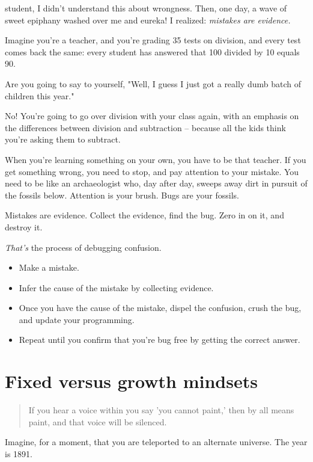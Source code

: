  student, I didn't understand this about wrongness. Then, one
day, a wave of sweet epiphany washed over me and eureka! I realized:
\textit{mistakes are evidence.}

Imagine you're a teacher, and you're grading 35 tests on division, and every test comes back the same: every student has answered that 100 divided
by 10 equals 90.

Are you going to say to yourself, "Well, I guess I just got a really dumb batch
of children this year."

No! You're going to go over division with your class again, with
an emphasis on the differences between division and subtraction -- because all
the kids think you're asking them to subtract.

When you're learning something on your own, you have to be that teacher. If you
get something wrong, you need to stop, and pay attention to your mistake. You
need to be like an archaeologist who, day after day, sweeps away dirt in pursuit of
the fossils below. Attention is your brush. Bugs are your fossils.

Mistakes are evidence. Collect the evidence, find the bug. Zero in on it, and destroy it.

\textit{That's} the process of debugging confusion.

\begin{itemize}
\item Make a mistake.
\item Infer the cause of the mistake by collecting evidence.
\item Once you have the cause of the mistake, dispel the confusion, crush the bug,
  and update your programming.
\item Repeat until you confirm that you're bug free by getting the correct answer.
\end{itemize}

\section{Fixed versus growth mindsets}

\begin{quote}
  If you hear a voice within you say 'you cannot paint,' then by all means
  paint, and that voice will be silenced.
\end{quote}

Imagine, for a moment, that you are teleported to an alternate universe. The
year is 1891.

